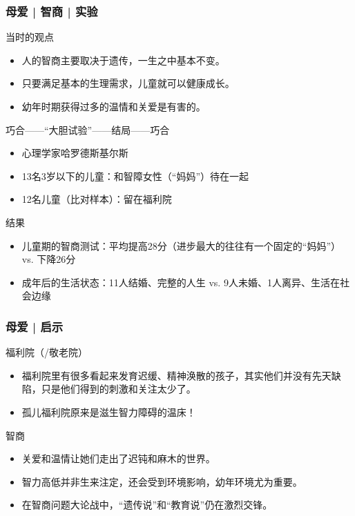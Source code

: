 \begin{frame}
  \frametitle{母爱 | 智商 | 实验}
  \begin{block}{当时的观点}
    \begin{itemize}
      \item 人的智商主要取决于遗传，一生之中基本不变。
      \item 只要满足基本的生理需求，儿童就可以健康成长。
      \item 幼年时期获得过多的温情和关爱是有害的。
    \end{itemize}
  \end{block}
  \vspace{-0.6em}
  \pause
  \begin{block}{巧合——“大胆试验”——结局——巧合}
    \begin{itemize}
      \item 心理学家哈罗德\textbullet 斯基尔斯
      \item 13名3岁以下的儿童：和智障女性（“妈妈”）待在一起
      \item 12名儿童（比对样本）：留在福利院
    \end{itemize}
  \end{block}
  \vspace{-0.6em}
  \pause
  \begin{block}{结果}
    \begin{itemize}
      \item 儿童期的智商测试：平均提高28分（进步最大的往往有一个固定的“妈妈”） vs. 下降26分
      \item 成年后的生活状态：11人结婚、完整的人生 vs. 9人未婚、1人离异、生活在社会边缘
    \end{itemize}
  \end{block}
\end{frame}

\begin{frame}
  \frametitle{母爱 | 启示}
  \begin{block}{福利院（/敬老院）}
    \begin{itemize}
      \item 福利院里有很多看起来发育迟缓、精神涣散的孩子，其实他们并没有先天缺陷，只是他们得到的刺激和关注太少了。
      \item \alert{孤儿福利院原来是滋生智力障碍的温床！}
    \end{itemize}
  \end{block}
  \pause
  \begin{block}{智商}
    \begin{itemize}
      \item 关爱和温情让她们走出了迟钝和麻木的世界。
      \item 智力高低并非生来注定，还会受到环境影响，幼年环境尤为重要。
      \item 在智商问题大论战中，“遗传说”和“教育说”仍在激烈交锋。
    \end{itemize}
  \end{block}
\end{frame}

